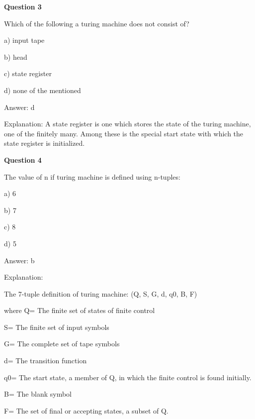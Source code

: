 \documentclass{article}
\begin{document}
\begin{mdframed}[linewidth=1pt, roundcorner=5pt, linecolor=gray!30, backgroundcolor=gray!5]
\textbf{Question 3} 

Which of the following a turing machine does not consist of?

a) input tape

b) head

c) state register

d) none of the mentioned
\vspace{5pt} \par
\begin{tcolorbox}[colback=green!5, colframe=green!40!black, title=Solution]
Answer: d

Explanation: A state register is one which stores the state of the turing machine, one of the finitely many. Among these is the special start state with which the state register is initialized.
\end{tcolorbox}
\end{mdframed}
\newpage

\begin{mdframed}[linewidth=1pt, roundcorner=5pt, linecolor=gray!30, backgroundcolor=gray!5]
\textbf{Question 4} 

The value of n if turing machine is defined using n-tuples:

a) 6

b) 7

c) 8

d) 5
\vspace{5pt} \par
\begin{tcolorbox}[colback=green!5, colframe=green!40!black, title=Solution]
Answer: b

Explanation:

The 7-tuple definition of turing machine: (Q, S, G, d, q0, B, F)

where Q= The finite set of states of finite control

S= The finite set of input symbols

G= The complete set of tape symbols

d= The transition function

q0= The start state, a member of Q, in which the finite control is found initially.

B= The blank symbol

F= The set of final or accepting states, a subset of Q.
\end{tcolorbox}
\end{mdframed}
\end{document}
